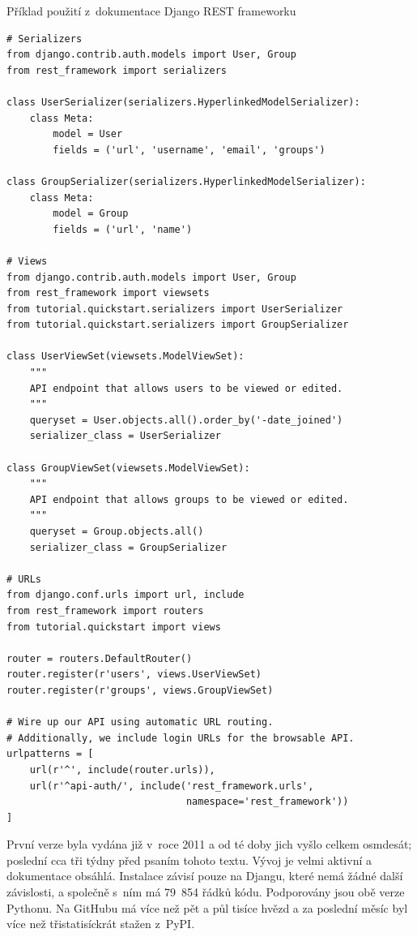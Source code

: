 \begin{listing}[htbp]
\caption{{\label{code:djangorest}Příklad použití z~dokumentace Django REST frameworku \autocite{djangorestdoc}}}
\begin{verbatim}
# Serializers
from django.contrib.auth.models import User, Group
from rest_framework import serializers

class UserSerializer(serializers.HyperlinkedModelSerializer):
    class Meta:
        model = User
        fields = ('url', 'username', 'email', 'groups')

class GroupSerializer(serializers.HyperlinkedModelSerializer):
    class Meta:
        model = Group
        fields = ('url', 'name')

# Views
from django.contrib.auth.models import User, Group
from rest_framework import viewsets
from tutorial.quickstart.serializers import UserSerializer
from tutorial.quickstart.serializers import GroupSerializer

class UserViewSet(viewsets.ModelViewSet):
    """
    API endpoint that allows users to be viewed or edited.
    """
    queryset = User.objects.all().order_by('-date_joined')
    serializer_class = UserSerializer

class GroupViewSet(viewsets.ModelViewSet):
    """
    API endpoint that allows groups to be viewed or edited.
    """
    queryset = Group.objects.all()
    serializer_class = GroupSerializer

# URLs
from django.conf.urls import url, include
from rest_framework import routers
from tutorial.quickstart import views

router = routers.DefaultRouter()
router.register(r'users', views.UserViewSet)
router.register(r'groups', views.GroupViewSet)

# Wire up our API using automatic URL routing.
# Additionally, we include login URLs for the browsable API.
urlpatterns = [
    url(r'^', include(router.urls)),
    url(r'^api-auth/', include('rest_framework.urls',
                               namespace='rest_framework'))
]
\end{verbatim}
\end{listing}

První verze byla vydána již v~roce 2011 a od té doby jich vyšlo celkem osmdesát; poslední cca tři týdny před psaním tohoto textu. Vývoj je velmi aktivní a dokumentace obsáhlá. Instalace závisí pouze na Djangu, které nemá žádné další závislosti, a společně s~ním má 79~854 řádků kódu. Podporovány jsou obě verze Pythonu. Na GitHubu má více než pět a půl tisíce hvězd a za poslední měsíc byl více než třistatisíckrát stažen z~PyPI.

